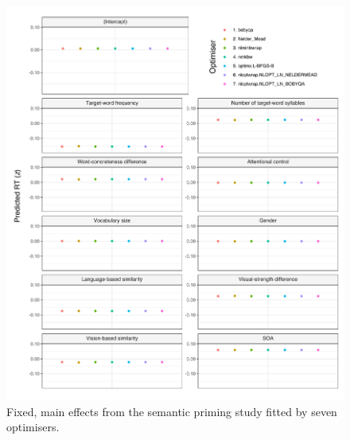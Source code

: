 \documentclass[
  12pt,
  man,floatsintext]{apa7}
\begin{document}
\begin{figure}

{\centering \includegraphics[width=1\linewidth]{../semanticpriming/analysis_with_visualsimilarity/model_diagnostics/plots/main_effects_semanticpriming_with_visualsimilarity_allFit_convergence} 

}

\caption{Fixed, main effects from the semantic priming study fitted by seven optimisers.}\label{fig:main-effects-semanticpriming-with-visualsimilarity-allFit-convergence}
\end{figure}
\end{document}
